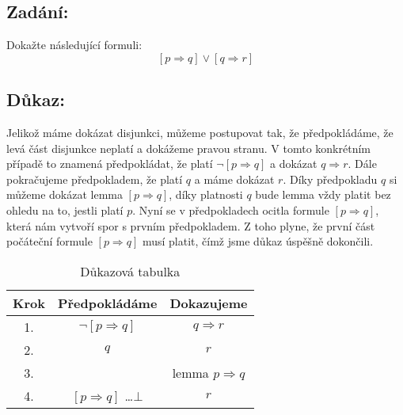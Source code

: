 \documentclass{article}
\begin{document}
\subsection{Zadání:}

Dokažte následující formuli:
$$[p \Rightarrow q] \lor [q \Rightarrow r]$$

\subsection{Důkaz:}

Jelikož máme dokázat disjunkci, můžeme postupovat tak, že předpokládáme, že levá část disjunkce neplatí a dokážeme pravou stranu. V tomto konkrétním případě to znamená předpokládat, že platí $\neg [p \Rightarrow q]$ a dokázat $q \Rightarrow r$. Dále pokračujeme předpokladem, že platí $q$ a máme dokázat $r$. Díky předpokladu $q$ si můžeme dokázat lemma $[p \Rightarrow q]$, díky platnosti $q$ bude lemma vždy platit bez ohledu na to, jestli platí $p$. Nyní se v předpokladech ocitla formule $[p \Rightarrow q]$, která nám vytvoří spor s prvním předpokladem. Z toho plyne, že první část počáteční formule $[p \Rightarrow q]$ musí platit, čímž jsme důkaz úspěšně dokončili.

\begin{table}[H]\centering

    \caption{Důkazová tabulka}

\begin{tabular}{|c|c|c|}
    
    
        \hline \textbf{Krok} & \textbf{Předpokládáme} & \textbf{Dokazujeme} \\ \hline \hline
    	1. & $\neg [p \Rightarrow q]$  & $q \Rightarrow r$ \\ \hline
    	2. & $q$  & $r$ \\ \hline
    	3. &   & lemma $p \Rightarrow q$ \\ \hline
    	4. & $[p \Rightarrow q]$ \dots $\bot$  & $r$ \\ \hline
            
    	\end{tabular}
\end{table}
\end{document}
